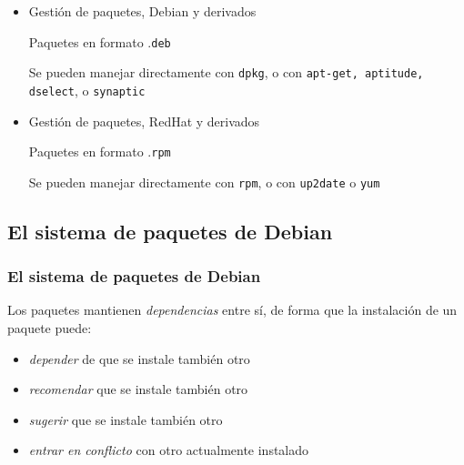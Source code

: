 \documentclass[ucs]{beamer}
\begin{document}
\begin{frame}[fragile]

\begin{itemize}	

\item 
Gestión de paquetes, Debian y derivados 

Paquetes en formato .\verb|deb|

Se pueden manejar directamente con \verb|dpkg|, o con \verb|apt-get, aptitude,|
\verb|dselect|, o \verb|synaptic| 

\item
Gestión de paquetes, RedHat y derivados

Paquetes en formato .\verb|rpm|

Se pueden manejar directamente con \verb|rpm|, o con \verb|up2date| o \verb|yum| 


\end{itemize}


\end{frame}
\subsection{El sistema de paquetes de Debian}

\begin{frame}[fragile]
\frametitle{El sistema de paquetes de Debian}

Los paquetes mantienen \emph{dependencias} entre sí, de forma que
  la instalación de un paquete puede:
  \begin{itemize}
  \item \emph{depender} de que se instale también otro
  \item \emph{recomendar} que se instale también otro
  \item \emph{sugerir} que se instale también otro
  \item \emph{entrar en conflicto} con otro actualmente instalado
  \end{itemize}


\end{frame}
\end{document}
